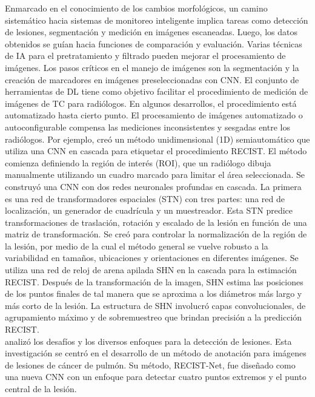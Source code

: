 \documentclass[11pt,a4paper,openany]{article}
\begin{document}
        Enmarcado en el conocimiento de los cambios morfológicos, un camino sistemático hacia sistemas de monitoreo inteligente implica tareas como detección de lesiones, segmentación y medición en imágenes escaneadas. Luego, los datos obtenidos se guían hacia funciones de comparación y evaluación. Varias técnicas de IA para el pretratamiento y filtrado pueden mejorar el procesamiento de imágenes. Los pasos críticos en el manejo de imágenes son la segmentación y la creación de marcadores en imágenes preseleccionadas con CNN. El conjunto de herramientas de DL tiene como objetivo facilitar el procedimiento de medición de imágenes de TC para radiólogos. En algunos desarrollos, el procedimiento está automatizado hasta cierto punto. El procesamiento de imágenes automatizado o autoconfigurable compensa las mediciones inconsistentes y sesgadas entre los radiólogos. Por ejemplo, \cite{Tang2018} creó un método unidimensional (1D) semiautomático que utiliza una CNN en cascada para etiquetar el procedimiento RECIST. El método comienza definiendo la región de interés (ROI), que un radiólogo dibuja manualmente utilizando un cuadro marcado para limitar el área seleccionada. Se construyó una CNN con dos redes neuronales profundas en cascada. La primera es una red de transformadores espaciales (STN) con tres partes: una red de localización, un generador de cuadrícula y un muestreador. Esta STN predice transformaciones de traslación, rotación y escalado de la lesión en función de una matriz de transformación. Se creó para controlar la normalización de la región de la lesión, por medio de la cual el método general se vuelve robusto a la variabilidad en tamaños, ubicaciones y orientaciones en diferentes imágenes. Se utiliza una red de reloj de arena apilada SHN en la cascada para la estimación RECIST. Después de la transformación de la imagen, SHN estima las posiciones de los puntos finales de tal manera que se aproxima a los diámetros más largo y más corto de la lesión. La estructura de SHN involucró capas convolucionales, de agrupamiento máximo y de sobremuestreo que brindan precisión a la predicción RECIST. \\

        \cite{Xie2021} analizó los desafíos y los diversos enfoques para la detección de lesiones. Esta investigación se centró en el desarrollo de un método de anotación para imágenes de lesiones de cáncer de pulmón. Su método, RECIST-Net, fue diseñado como una nueva CNN con un enfoque para detectar cuatro puntos extremos y el punto central de la lesión. \\
\end{document}
